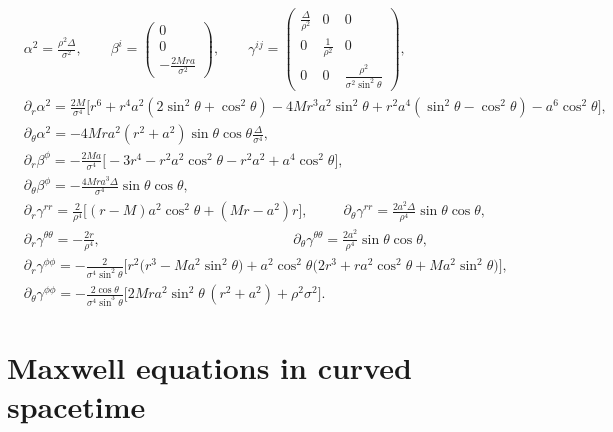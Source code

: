 \documentclass{article}
\begin{document}
\begin{equation}
\begin{aligned}
    &\alpha^2 = \frac{\rho^2\Delta}{\sigma^2},\qquad \beta^i = \begin{pmatrix}
    0\\
    0\\
    -\frac{2Mra}{\sigma^2}
    \end{pmatrix},\qquad \gamma^{ij} = \begin{pmatrix}
    \frac{\Delta}{\rho^2} & 0 & 0\\
    0 & \frac{1}{\rho^2} & 0\\
    0 & 0 & \frac{\rho^2}{\sigma^2\sin^2\theta}
    \end{pmatrix},\\
    &\partial_r\alpha^2 = \frac{2M}{\sigma^4}\Big[r^6 + r^4a^2(2\sin^2\theta + \cos^2\theta) - 4Mr^3a^2\sin^2\theta + r^2a^4(\sin^2\theta - \cos^2\theta) - a^6\cos^2\theta\Big],\\
    &\partial_\theta\alpha^2 = -4Mra^2(r^2 + a^2)\sin\theta\cos\theta\frac{\Delta}{\sigma^4},\\
    &\partial_r\beta^\phi = -\frac{2Ma}{\sigma^4}\big[-3r^4 - r^2a^2\cos^2\theta - r^2a^2 + a^4\cos^2\theta\big],\\
    &\partial_\theta\beta^\phi = -\frac{4Mra^3\Delta}{\sigma^4}\sin\theta\cos\theta,\\
    &\partial_r\gamma^{rr} = \frac{2}{\rho^4}\Big[(r-M)a^2\cos^2\theta + (Mr-a^2)r\Big],\hspace{30pt} \partial_\theta\gamma^{rr} = \frac{2a^2\Delta}{\rho^4}\sin\theta\cos\theta,\\
    &\partial_r\gamma^{\theta\theta} = -\frac{2r}{\rho^4},\hspace{165pt} \partial_\theta\gamma^{\theta\theta} = \frac{2a^2}{\rho^4}\sin\theta\cos\theta,\\
    &\partial_r\gamma^{\phi\phi} = -\frac{2}{\sigma^4\sin^2\theta} \Big[r^2\big(r^3 - Ma^2\sin^2\theta\big) + a^2\cos^2\theta\big(2r^3 + ra^2\cos^2\theta + Ma^2\sin^2\theta\big)\Big],\\
    &\partial_\theta\gamma^{\phi\phi} = -\frac{2\cos\theta}{\sigma^4\sin^3\theta}\Big[2Mra^2\sin^2\theta\,(r^2 + a^2) + \rho^2\sigma^2\Big].
\end{aligned}
\end{equation}


\section{Maxwell equations in curved spacetime}
\end{document}
